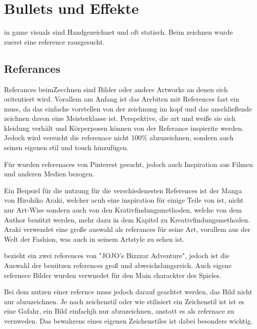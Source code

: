 
\section{Bullets und Effekte}\label{sec:bullets-und-effekte}

\renewcommand{\kapitelautor}{Autor: Philip Jankovic}


\FF in game visuals sind Handgezeichnet und oft statisch. Beim zeichnen wurde zuerst eine reference rausgesucht.


\subsection{Referances}\label{subsec:references}
Referances beimZecchnen sind Bilder oder andere Artworks an denen sich oritentiert wird. Vorallem am Anfang ist das
Arebiten mit References fast ein muss, da das einfache vorstellen von der zeichnung im kopf und das anschließende zeichnen davon eine Meisterklasse ist.
Perspektive, die art und weiße sie sich kleidung verhält und Körperposen können von der Referance inspierite werden.
Jedoch wird versucht die referenace nicht 100\% abzuzeichnen, sondern auch seinen eigenen stil und touch hinzufügen. 


Für \FF wurden referenaces von Pinterest gesucht, jedoch auch Inspiration aus Filmen und anderen Medien bezogen.


Ein Beipsiel für die nutzung für die verschiedenesten References ist der Manga  von Hirohiko Araki,
welcher acuh eine inspiration für einige Teile von \FF ist, nicht nur Art-Wise sondern auch von den Krativfindungsmethoden, welche von dem Author benützt werden, mehr dazu in dem
Kapitel zu Kreativfindungsmethoden. %
Araki verwendet eine große auswahl als referances für seine Art, vorallem aus der Welt
der Fashion, was auch in seinem Artstyle zu sehen ist.


\FF bezieht ein zwei references von "JOJO's Bizzzar Adventure", jedoch ist die Auswahl der benützen references groß und abweichslungsreich.
Auch eigene refernece Bilder wurden verwnedet für den Main charackter des Spieles.


Bei dem nutzen einer refernce muss jedoch darauf geachtet werden, das Bild nicht nur abzuzeichnen. Je nach zeichenstil
oder wie stilisiert ein Zeichenstil ist ist es eine Gafahr, ein  Bild einfachjh nur abzuzeichnen, anstatt es als refernace zu vernweden.
Das bewahrens eines eigenen Zeichenstiles ist dabei besonders wichtig.


